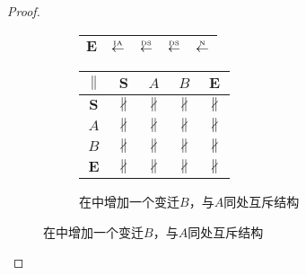 \begin{proof}
\begin{figure}[htbp]
\begin{subfigure}{1\textwidth}
\begin{minipage}[b]{0.3\textwidth}
\begin{tabular}{|c|c|c|c|c|}
        $\bm{E}$ & $\overset{\text{\tiny{IA}}}{\leftarrow}$ & $\overset{\text{\tiny{DS}}}{\leftarrow}$ & $\overset{\text{\tiny{DS}}}{\leftarrow}$ & $\overset{\text{\tiny{N}}}{\leftarrow}$\\ \hline
      \end{tabular}
    \end{minipage}
    \begin{minipage}[b]{0.3\textwidth}
      \vspace{1em}
      \centering
      \begin{tabular}{|c|c|c|c|c|} \hline
        $\parallel$ & $\bm{S}$ & $A$ & $B$ & $\bm{E}$\\ \hline
        $\bm{S}$ & $\nparallel$ & $\nparallel$ & $\nparallel$ & $\nparallel$\\ \hline
        $A$ & $\nparallel$ & $\nparallel$ & $\nparallel$ & $\nparallel$\\ \hline
        $B$ & $\nparallel$ & $\nparallel$ & $\nparallel$ & $\nparallel$\\ \hline
        $\bm{E}$ & $\nparallel$ & $\nparallel$ & $\nparallel$ & $\nparallel$\\ \hline
      \end{tabular}
    \end{minipage}
    \caption{在中增加一个变迁$B$，与$A$同处互斥结构}
    \label{fig:uniqueness_2_d}
  \end{subfigure}


\end{figure}
\end{proof}
